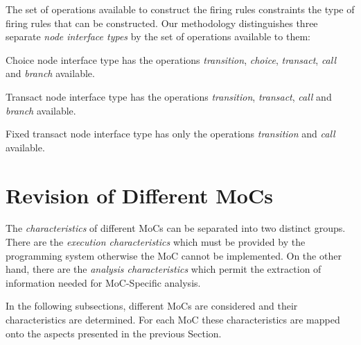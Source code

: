 The set of operations available to construct the firing rules constraints
the type of firing rules that can be constructed.
Our methodology distinguishes three separate \emph{node interface types}
by the set of operations available to them:

\begin{definition}\label{choice-node-interface-type}
Choice node interface type has the operations
\emph{transition}, \emph{choice}, \emph{transact}, \emph{call} and \emph{branch} available.
\end{definition}

\begin{definition}\label{transact-node-interface-type}
Transact node interface type has the operations
\emph{transition}, \emph{transact}, \emph{call} and \emph{branch} available.
\end{definition}

\begin{definition}\label{fixed-transact-node-interface-type}
Fixed transact node interface type has only the operations
\emph{transition} and \emph{call} available.
\end{definition}


\section{Revision of Different MoCs}\label{revision-of-mocs}

The \emph{characteristics} of different MoCs can be separated into two distinct groups.
There are the \emph{execution characteristics} which must be provided by
the programming system otherwise the MoC cannot be implemented.
On the other hand, there are the \emph{analysis characteristics} which
permit the extraction of information needed for MoC-Specific analysis.

In the following subsections, different MoCs are considered and their
characteristics are determined. For each MoC these characteristics are
mapped onto the aspects presented in the previous Section.

